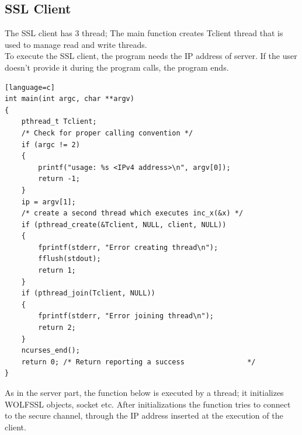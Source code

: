 \documentclass[a4paper,12pt]{report}
\begin{document}
\subsection{SSL Client}
The SSL client has 3 thread; The main function creates Tclient thread that is used to manage read and write threads.
\\To execute the SSL client, the program needs the IP address of server. If the user doesn't provide it during the program calls, the program ends. 
\begin{lstlisting}[caption={int main() of SSL client},captionpos=b][language=c]
int main(int argc, char **argv)
{
    pthread_t Tclient;
    /* Check for proper calling convention */
    if (argc != 2)
    {
        printf("usage: %s <IPv4 address>\n", argv[0]);
        return -1;
    }
    ip = argv[1];
    /* create a second thread which executes inc_x(&x) */
    if (pthread_create(&Tclient, NULL, client, NULL))
    {
        fprintf(stderr, "Error creating thread\n");
        fflush(stdout);
        return 1;
    }
    if (pthread_join(Tclient, NULL))
    {
        fprintf(stderr, "Error joining thread\n");
        return 2;
    }
    ncurses_end();
    return 0; /* Return reporting a success               */
}
\end{lstlisting}
As in the server part, the function below is executed by a thread; it initializes WOLFSSL objects, socket etc. After initializations the function tries to connect to the secure channel, through the IP address inserted at the execution of the client.
\end{document}
